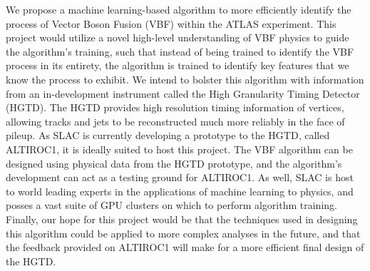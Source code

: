 \documentclass[paper=a4,fontsize=12pt]{article}
\begin{document}
We propose a machine learning-based algorithm to more efficiently identify the process of Vector Boson Fusion (VBF) within the ATLAS experiment. This project would utilize a novel high-level understanding of VBF physics to guide the algorithm's training, such that instead of being trained to identify the VBF process in its entirety, the algorithm is trained to identify key features that we know the process to exhibit. We intend to bolster this algorithm with information from an in-development instrument called the High Granularity Timing Detector (HGTD). The HGTD provides high resolution timing information of vertices, allowing tracks and jets to be reconstructed much more reliably in the face of pileup. As SLAC is currently developing a prototype to the HGTD, called ALTIROC1, it is ideally suited to host this project. The VBF algorithm can be designed using physical data from the HGTD prototype, and the algorithm's development can act as a testing ground for ALTIROC1. As well, SLAC is host to world leading experts in the applications of machine learning to physics, and posses a vast suite of GPU clusters on which to perform algorithm training. Finally, our hope for this project would be that the techniques used in designing this algorithm could be applied to more complex analyses in the future, and that the feedback provided on ALTIROC1 will make for a more efficient final design of the HGTD.
\end{document}
